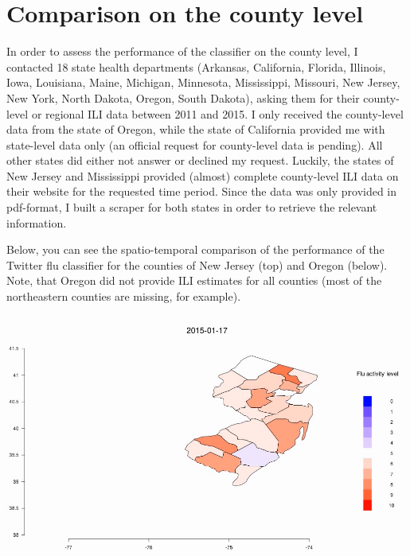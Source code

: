 \documentclass[11pt, a4paper,twoside]{report}\usepackage[]{graphicx}\usepackage[]{color}
\begin{document}
\section{Comparison on the county level}
In order to assess the performance of the classifier on the county level, I contacted 18 state health departments (Arkansas, California, Florida, Illinois, Iowa, Louisiana, Maine, Michigan, Minnesota, Mississippi, Missouri, New Jersey, New York, North Dakota, Oregon, South Dakota), asking them for their county-level or regional ILI data between 2011 and 2015. I only received the county-level data from the state of Oregon, while the state of California provided me with state-level data only (an official request for county-level data is pending). All other states did either not answer or declined my request. Luckily, the states of New Jersey and Mississippi provided (almost) complete county-level ILI data on their website for the requested time period. Since the data was only provided in pdf-format, I built a scraper for both states in order to retrieve the relevant information.\newline 

Below, you can see the spatio-temporal comparison of the performance of the Twitter flu classifier for the counties of New Jersey (top) and Oregon (below). Note, that Oregon did not provide ILI estimates for all counties (most of the northeastern counties are missing, for example).\newline

\centering \href{run:vids/county_Twitter_cdc_diff_newjersey.avi}{\includegraphics[scale=0.5]{vids/Screenshot_Jersey.png}} 

\bigskip
\end{document}
